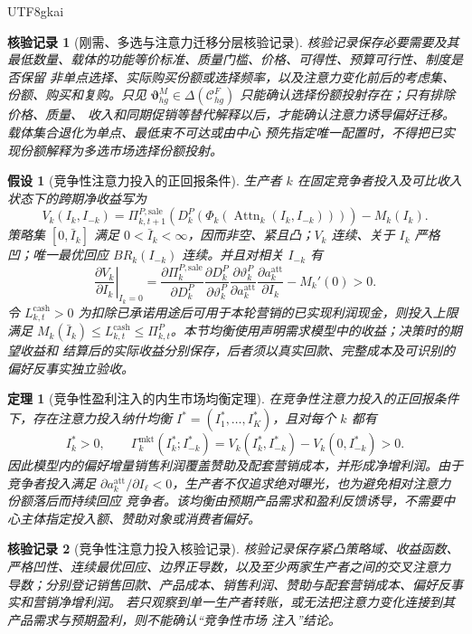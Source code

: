 \documentclass[12pt,a4paper,openany]{report}
\newtheorem{assumption}{假设}[chapter]
\newtheorem{theorem}{定理}[chapter]
\newtheorem{Certificate}{核验记录}[chapter]
\begin{document}
\begin{CJK*}{UTF8}{gkai}
\begin{Certificate}[刚需、多选与注意力迁移分层核验记录]
核验记录保存必要需要及其最低数量、载体的功能等价标准、质量门槛、价格、可得性、预算可行性、制度是否保留
非单点选择、实际购买份额或选择频率，以及注意力变化前后的考虑集、份额、购买和复购。只见
\(\boldsymbol\vartheta_{hg}^{M}\in\Delta(\mathcal C_{hg}^{F})\) 只能确认选择份额投射存在；只有排除价格、质量、
收入和同期促销等替代解释以后，才能确认注意力诱导偏好迁移。载体集合退化为单点、最低束不可达或由中心
预先指定唯一配置时，不得把已实现份额解释为多选市场选择份额投射。
\end{Certificate}

\begin{assumption}[竞争性注意力投入的正回报条件]
生产者 \(k\) 在固定竞争者投入及可比收入状态下的跨期净收益写为
\[
  V_k(I_k,I_{-k})
  =\Pi_{k,t+1}^{P,\mathrm{sale}}\!\left(D_k^P\!\left(
  \Phi_k\!\left(\operatorname{Attn}_k(I_k,I_{-k})\right)\right)\right)-M_k(I_k).
\]
策略集 \([0,\bar I_k]\) 满足 \(0<\bar I_k<\infty\)，因而非空、紧且凸；\(V_k\) 连续、关于 \(I_k\) 严格凹；唯一最优回应
\(BR_k(I_{-k})\) 连续。并且对相关 \(I_{-k}\) 有
\[
  \left.\frac{\partial V_k}{\partial I_k}\right|_{I_k=0}
  =
  \frac{\partial\Pi_k^{P,\mathrm{sale}}}{\partial D_k^P}
  \frac{\partial D_k^P}{\partial\vartheta_k^P}
  \frac{\partial\vartheta_k^P}{\partial a_k^{\mathrm{att}}}
  \frac{\partial a_k^{\mathrm{att}}}{\partial I_k}-M_k'(0)
  >0.
\]
令 \(L_{k,t}^{\mathrm{cash}}>0\) 为扣除已承诺用途后可用于本轮营销的已实现利润现金，则投入上限满足
\(M_k(\bar I_k)\le L_{k,t}^{\mathrm{cash}}\le\Pi_{k,t}^P\)。本节均衡使用声明需求模型中的收益；决策时的期望收益和
结算后的实际收益分别保存，后者须以真实回款、完整成本及可识别的偏好反事实独立验收。
\end{assumption}

\begin{theorem}[竞争性盈利注入的内生市场均衡定理]
\label{thm:competitive-attention-injection}
在竞争性注意力投入的正回报条件下，存在注意力投入纳什均衡
\(I^*=(I_1^*,\ldots,I_K^*)\)，且对每个 \(k\) 都有
\[
  I_k^*>0,\qquad
  \Gamma_k^{\mathrm{mkt}}(I_k^*;I_{-k}^*)
  =V_k(I_k^*,I_{-k}^*)-V_k(0,I_{-k}^*)>0.
\]
因此模型内的偏好增量销售利润覆盖赞助及配套营销成本，并形成净增利润。由于竞争者投入满足
\(\partial a_k^{\mathrm{att}}/\partial I_\ell<0\)，生产者不仅追求绝对曝光，也为避免相对注意力份额落后而持续回应
竞争者。该均衡由预期产品需求和盈利反馈诱导，不需要中心主体指定投入额、赞助对象或消费者偏好。
\end{theorem}

\begin{Certificate}[竞争性注意力投入核验记录]
核验记录保存紧凸策略域、收益函数、严格凹性、连续最优回应、边界正导数，以及至少两家生产者之间的交叉注意力
导数；分别登记销售回款、产品成本、销售利润、赞助与配套营销成本、偏好反事实和营销净增利润。
若只观察到单一生产者转账，或无法把注意力变化连接到其产品需求与预期盈利，则不能确认“竞争性市场
注入”结论。
\end{Certificate}


\end{CJK*}
\end{document}
